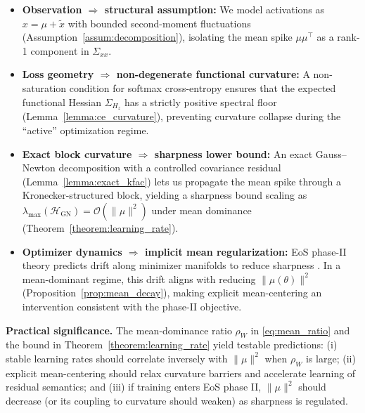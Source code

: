 \documentclass[11pt]{article}
\begin{document}
\begin{itemize}
  \item \textbf{Observation $\Rightarrow$ structural assumption:} We model activations as $x=\mu+\tilde x$ with bounded second-moment fluctuations (Assumption~\ref{assum:decomposition}), isolating the mean spike $\mu\mu^\top$ as a rank-1 component in $\Sigma_{xx}$.
  \item \textbf{Loss geometry $\Rightarrow$ non-degenerate functional curvature:} A non-saturation condition for softmax cross-entropy ensures that the expected functional Hessian $\Sigma_{H_z}$ has a strictly positive spectral floor (Lemma~\ref{lemma:ce_curvature}), preventing curvature collapse during the ``active'' optimization regime.
  \item \textbf{Exact block curvature $\Rightarrow$ sharpness lower bound:} An exact Gauss--Newton decomposition with a controlled covariance residual (Lemma~\ref{lemma:exact_kfac}) lets us propagate the mean spike through a Kronecker-structured block, yielding a sharpness bound scaling as $\lambda_{\max}(\mathcal{H}_{\mathrm{GN}})=\mathcal{O}(\|\mu\|^2)$ under mean dominance (Theorem~\ref{theorem:learning_rate}).
  \item \textbf{Optimizer dynamics $\Rightarrow$ implicit mean regularization:} EoS phase-II theory predicts drift along minimizer manifolds to reduce sharpness \citep{arora2022understanding}.
In a mean-dominant regime, this drift aligns with reducing $\|\mu(\theta)\|^2$ (Proposition~\ref{prop:mean_decay}), making explicit mean-centering an intervention consistent with the phase-II objective.
\end{itemize}

\textbf{Practical significance.} The mean-dominance ratio $\rho_W$ in \eqref{eq:mean_ratio} and the bound in Theorem~\ref{theorem:learning_rate} yield testable predictions: (i) stable learning rates should correlate inversely with $\|\mu\|^2$ when $\rho_W$ is large;
(ii) explicit mean-centering should relax curvature barriers and accelerate learning of residual semantics;
and (iii) if training enters EoS phase II, $\|\mu\|^2$ should decrease (or its coupling to curvature should weaken) as sharpness is regulated.



\end{document}
